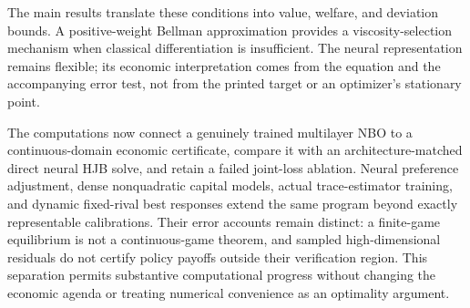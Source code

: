 \documentclass[ecta,draft]{econsocart}
\theoremstyle{definition}
\theoremstyle{remark}
\begin{document}
The main results translate these conditions into value, welfare, and deviation bounds. A positive-weight Bellman approximation provides a viscosity-selection mechanism when classical differentiation is insufficient. The neural representation remains flexible; its economic interpretation comes from the equation and the accompanying error test, not from the printed target or an optimizer's stationary point.

The computations now connect a genuinely trained multilayer NBO to a continuous-domain economic certificate, compare it with an architecture-matched direct neural HJB solve, and retain a failed joint-loss ablation. Neural preference adjustment, dense nonquadratic capital models, actual trace-estimator training, and dynamic fixed-rival best responses extend the same program beyond exactly representable calibrations. Their error accounts remain distinct: a finite-game equilibrium is not a continuous-game theorem, and sampled high-dimensional residuals do not certify policy payoffs outside their verification region. This separation permits substantive computational progress without changing the economic agenda or treating numerical convenience as an optimality argument.
\end{document}
